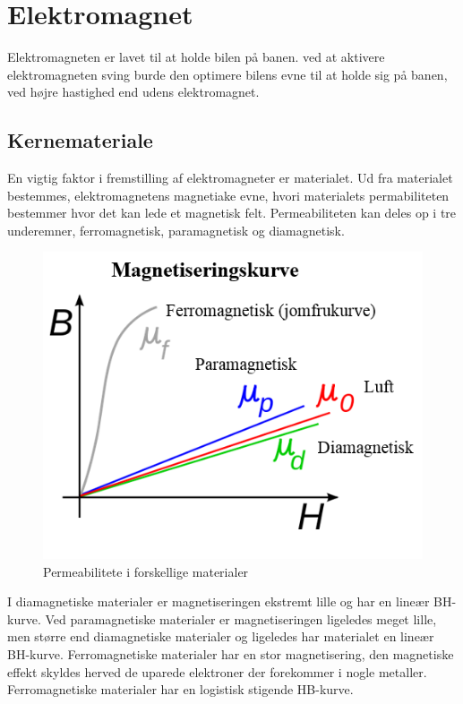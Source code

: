\section{Elektromagnet}
Elektromagneten er lavet til at holde bilen på banen. ved at aktivere elektromagneten sving burde den optimere bilens evne til at holde sig på banen, ved højre hastighed end udens elektromagnet.

\subsection{Kernemateriale}
En vigtig faktor i fremstilling af elektromagneter er materialet. Ud fra materialet bestemmes, elektromagnetens magnetiake evne, hvori materialets permabiliteten bestemmer hvor det kan lede et magnetisk felt. Permeabiliteten kan deles op i tre underemner, ferromagnetisk, paramagnetisk og diamagnetisk. \\
\begin{figure}
\includegraphics[scale=0.4]{./Graphics/Magnetiseringskurve}
\caption{Permeabilitete i forskellige materialer}
\label{Permeabilitet}
\end{figure}
I diamagnetiske materialer er magnetiseringen ekstremt lille og har en lineær BH-kurve. Ved paramagnetiske materialer er magnetiseringen ligeledes meget lille, men større end diamagnetiske materialer og ligeledes har materialet en lineær BH-kurve. Ferromagnetiske materialer har en stor magnetisering, den magnetiske effekt skyldes herved de uparede elektroner der forekommer i nogle metaller. Ferromagnetiske materialer har en logistisk stigende HB-kurve.\\
